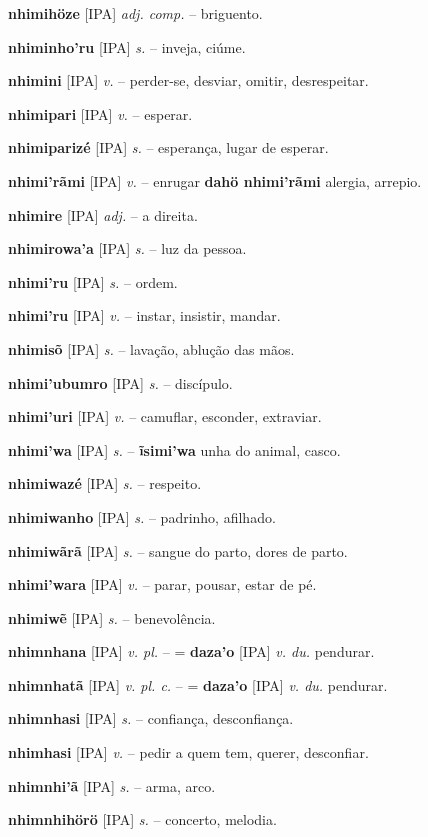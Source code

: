 \textbf{nhimihöze} [IPA] \textit{adj. comp.} -- briguento.

\textbf{nhiminho'ru} [IPA] \textit{s.} -- inveja, ciúme.

\textbf{nhimini} [IPA] \textit{v.} -- perder-se, desviar, omitir, desrespeitar.

\textbf{nhimipari} [IPA] \textit{v.} -- esperar.

\textbf{nhimiparizé} [IPA] \textit{s.} -- esperança, lugar de esperar.

\textbf{nhimi'rãmi} [IPA] \textit{v.} -- enrugar  \textbf{dahö nhimi'rãmi} alergia, arrepio.

\textbf{nhimire} [IPA] \textit{adj.} -- a direita.

\textbf{nhimirowa'a} [IPA] \textit{s.} -- luz da pessoa.

\textbf{nhimi'ru} [IPA] \textit{s.} -- ordem.

\textbf{nhimi'ru} [IPA] \textit{v.} -- instar, insistir, mandar.

\textbf{nhimisõ} [IPA] \textit{s.} -- lavação, ablução das mãos.

\textbf{nhimi'ubumro} [IPA] \textit{s.} -- discípulo.

\textbf{nhimi'uri} [IPA] \textit{v.} -- camuflar, esconder, extraviar.

\textbf{nhimi'wa} [IPA] \textit{s.} -- \textbf{ĩsimi'wa} unha do animal, casco.

\textbf{nhimiwazé} [IPA] \textit{s.} -- respeito.

\textbf{nhimiwanho} [IPA] \textit{s.} -- padrinho, afilhado.

\textbf{nhimiwãrã} [IPA] \textit{s.} -- sangue do parto, dores de parto.

\textbf{nhimi'wara} [IPA] \textit{v.} -- parar, pousar, estar de pé.

\textbf{nhimiwẽ} [IPA] \textit{s.} -- benevolência.

\textbf{nhimnhana} [IPA] \textit{v. pl.} -- = \textbf{daza'o} [IPA] \textit{v. du.} pendurar.

\textbf{nhimnhatã} [IPA] \textit{v. pl. c.} -- = \textbf{daza'o} [IPA] \textit{v. du.} pendurar.

\textbf{nhimnhasi} [IPA] \textit{s.} -- confiança, desconfiança.

\textbf{nhimhasi} [IPA] \textit{v.} -- pedir a quem tem, querer, desconfiar.

\textbf{nhimnhi'ã} [IPA] \textit{s.} -- arma, arco.

\textbf{nhimnhihörö} [IPA] \textit{s.} -- concerto, melodia.

